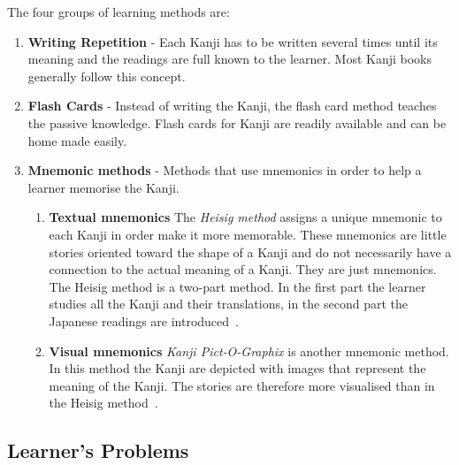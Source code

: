 The four groups of learning methods are:
\begin{enumerate}
  \item \textbf{Writing Repetition} - Each Kanji has to be written several times
        until its meaning and the readings are full known to the learner.
        Most Kanji books generally follow this concept.

  \item \textbf{Flash Cards} - Instead of writing the Kanji, the flash card 
        method teaches the passive knowledge. Flash cards for Kanji are readily
        available and can be home made easily.

  \item \textbf{Mnemonic methods} - Methods that use mnemonics in order to help
        a learner memorise the Kanji.
        \begin{enumerate}
          \item \textbf{Textual mnemonics} The \emph{Heisig method} assigns a 
                unique mnemonic to each Kanji in order make it more memorable. 
                These mnemonics are little stories oriented toward the shape
                of a Kanji and do not necessarily have a connection to the 
                actual meaning of a Kanji. They are just mnemonics. 
                The Heisig method is a two-part method. In the first part
                the learner studies all the Kanji and their translations, 
                in the second part the Japanese readings are 
                introduced~.

          \item \textbf{Visual mnemonics} \emph{Kanji Pict-O-Graphix} is 
                another mnemonic method. In this method the Kanji are 
                depicted with images that represent the meaning of the Kanji.
                The stories are therefore more visualised than in the Heisig 
                method~.
          \end{enumerate}
\end{enumerate}


\subsection{Learner's Problems}
\label{sec:learnersproblems}

